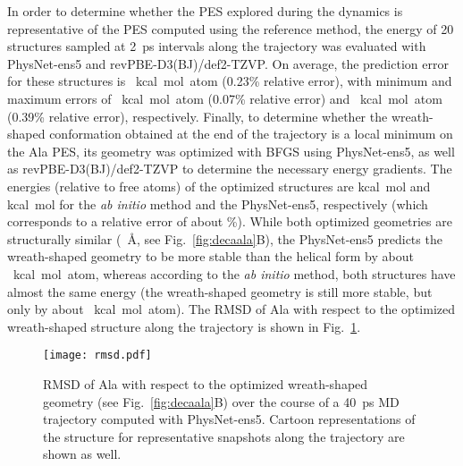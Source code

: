 \documentclass[12pt]{article}
\newcommand{\nn}{PhysNet}
\begin{document}
In order to determine whether the PES explored during the dynamics is
representative of the PES computed using the reference method, the
energy of \num{20} structures sampled at \num{2}~ps intervals along
the trajectory was evaluated with \nn-ens5 and
revPBE-D3(BJ)/def2-TZVP. On average, the prediction error for these
structures is ~kcal~mol~atom (0.23\% relative
error), with minimum and maximum errors of
~kcal~mol~atom (0.07\% relative error) and
~kcal~mol~atom (0.39\% relative error),
respectively. Finally, to determine whether the wreath-shaped
conformation obtained at the end of the trajectory is a local minimum
on the Ala PES, its geometry was optimized with BFGS using
\nn-ens5, as well as revPBE-D3(BJ)/def2-TZVP to determine the
necessary energy gradients. The energies (relative to free atoms) of
the optimized structures are  kcal~mol and
 kcal~mol for the \textit{ab initio} method and the
\nn-ens5, respectively (which corresponds to a relative error of about
\%). While both optimized geometries are structurally similar
(~\AA, see Fig.~\ref{fig:decaala}B), the \nn-ens5
predicts the wreath-shaped geometry to be more stable than the helical
form by about ~kcal~mol~atom, whereas according
to the \textit{ab initio} method, both structures have almost the same
energy (the wreath-shaped geometry is still more stable, but only by
about ~kcal~mol~atom). The RMSD of Ala
with respect to the optimized wreath-shaped structure along the
trajectory is shown in Fig.~\ref{fig:rmsd_trajectory}.

\begin{figure}[htbp]
	\centering
	\texttt{[image: rmsd.pdf]}
	\caption{RMSD of Ala with respect to the optimized
		wreath-shaped geometry (see Fig.~\ref{fig:decaala}B) over the course
		of a \num{40}~ps MD trajectory computed with \nn-ens5. Cartoon
		representations of the structure for representative snapshots along
		the trajectory are shown as well.}
	\label{fig:rmsd_trajectory}
\end{figure} 
\end{document}
